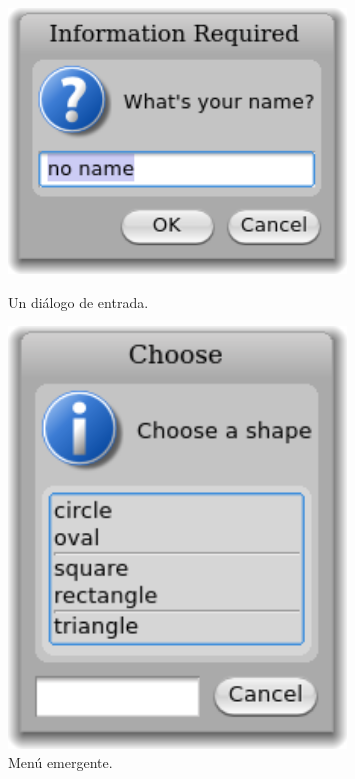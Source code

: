 \documentclass[a4paper,10pt,twoside]{book}
\begin{document}
\begin{figure}[htb]
\begin{minipage}{0.48\textwidth}
	\centerline{\includegraphics[width=0.8\textwidth]{dialog}}
	\caption{Un di\'alogo de entrada.}
\end{minipage}
\hfill
\begin{minipage}{0.48\textwidth}
	\vfill
	\centerline{\includegraphics [width=0.8\textwidth]{popup}}
	\vfill
	\vspace{4ex}
	\caption{Men\'u emergente.}
\end{minipage}
\end{figure}
\end{document}

